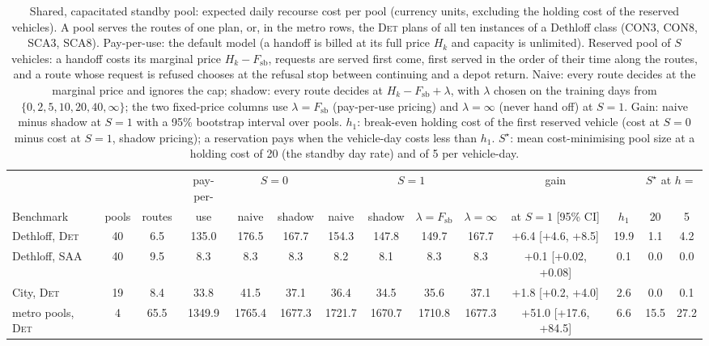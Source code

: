 \begin{table}[t]
\caption{Shared, capacitated standby pool: expected daily recourse cost per
pool (currency units, excluding the holding cost of the reserved
vehicles). A pool serves the routes of one plan, or, in the metro rows,
the \textsc{Det} plans of all ten instances of a Dethloff class
(CON3, CON8, SCA3, SCA8). Pay-per-use: the default model (a handoff is
billed at its full price $H_k$ and capacity is unlimited). Reserved
pool of $S$ vehicles: a handoff costs its marginal price $H_k -
F_{\mathrm{sb}}$, requests are served first come, first served in the
order of their time along the routes, and a route whose request is
refused chooses at the refusal stop between continuing and a depot
return. Naive: every route decides at the marginal price and ignores
the cap; shadow: every route decides at $H_k - F_{\mathrm{sb}} +
\lambda$, with $\lambda$ chosen on the training days from
$\{0, 2, 5, 10, 20, 40, \infty\}$; the two fixed-price columns use
$\lambda = F_{\mathrm{sb}}$ (pay-per-use pricing) and $\lambda = \infty$
(never hand off) at $S = 1$. Gain: naive minus shadow at $S = 1$ with a
95\% bootstrap interval over pools. $h_1$: break-even holding cost of the
first reserved vehicle (cost at $S = 0$ minus cost at $S = 1$, shadow
pricing); a reservation pays when the vehicle-day costs less than $h_1$.
$S^\star$: mean cost-minimising pool size at a holding cost of 20 (the
standby day rate) and of 5 per vehicle-day.}
\label{tab:pool}
\centering
\scriptsize
\setlength{\tabcolsep}{2.4pt}
\begin{adjustbox}{max width=\linewidth}
\begin{tabular}{l cc c cc cccc c c cc}
\toprule
& & & pay-per- & \multicolumn{2}{c}{$S = 0$} & \multicolumn{4}{c}{$S = 1$} & gain & & \multicolumn{2}{c}{$S^\star$ at $h =$} \\ \cmidrule(lr){5-6}\cmidrule(lr){7-10}\cmidrule(lr){13-14}
Benchmark & pools & routes & use & naive & shadow & naive & shadow & $\lambda{=}F_{\mathrm{sb}}$ & $\lambda{=}\infty$ & at $S{=}1$ [95\% CI] & $h_1$ & 20 & 5 \\
\midrule
Dethloff, \textsc{Det} & 40 & 6.5 & 135.0 & 176.5 & 167.7 & 154.3 & 147.8 & 149.7 & 167.7 & +6.4 [+4.6, +8.5] & 19.9 & 1.1 & 4.2 \\
Dethloff, \textsc{SAA} & 40 & 9.5 & 8.3 & 8.3 & 8.3 & 8.2 & 8.1 & 8.3 & 8.3 & +0.1 [+0.02, +0.08] & 0.1 & 0.0 & 0.0 \\
City, \textsc{Det} & 19 & 8.4 & 33.8 & 41.5 & 37.1 & 36.4 & 34.5 & 35.6 & 37.1 & +1.8 [+0.2, +4.0] & 2.6 & 0.0 & 0.1 \\
metro pools, \textsc{Det} & 4 & 65.5 & 1349.9 & 1765.4 & 1677.3 & 1721.7 & 1670.7 & 1710.8 & 1677.3 & +51.0 [+17.6, +84.5] & 6.6 & 15.5 & 27.2 \\
\bottomrule
\end{tabular}
\end{adjustbox}
\end{table}
